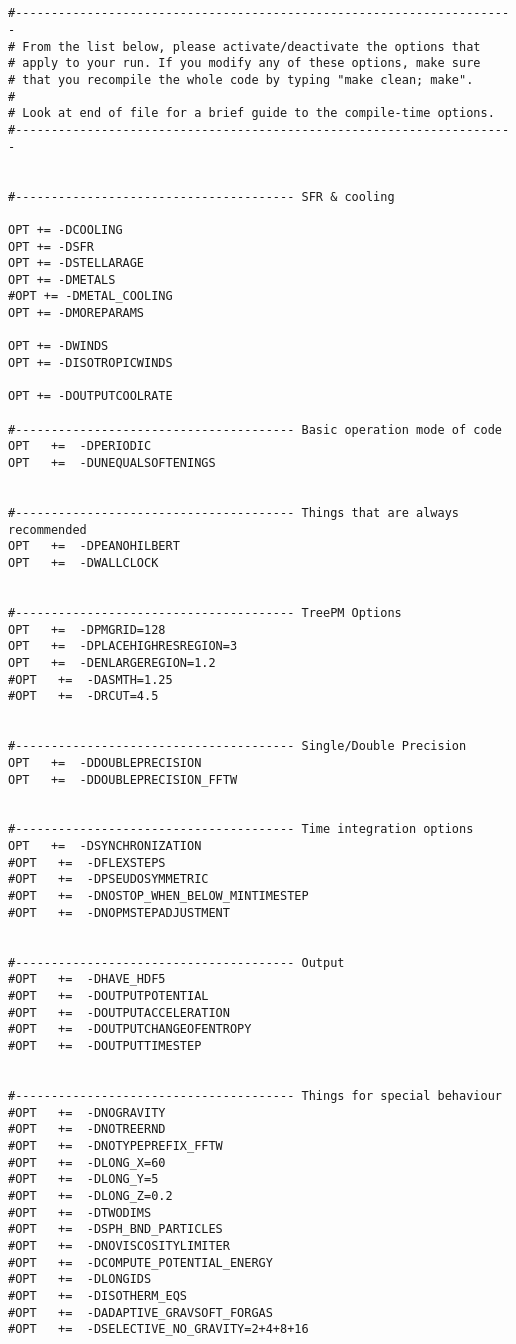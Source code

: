 \documentclass[a4paper,english,10.5pt]{scrartcl}
\begin{document}
\begin{verbatim}
 

#----------------------------------------------------------------------
# From the list below, please activate/deactivate the options that     
# apply to your run. If you modify any of these options, make sure     
# that you recompile the whole code by typing "make clean; make".      
#                                                                      
# Look at end of file for a brief guide to the compile-time options.   
#----------------------------------------------------------------------


#--------------------------------------- SFR & cooling

OPT += -DCOOLING
OPT += -DSFR
OPT += -DSTELLARAGE
OPT += -DMETALS
#OPT += -DMETAL_COOLING
OPT += -DMOREPARAMS

OPT += -DWINDS
OPT += -DISOTROPICWINDS

OPT += -DOUTPUTCOOLRATE

#--------------------------------------- Basic operation mode of code
OPT   +=  -DPERIODIC 
OPT   +=  -DUNEQUALSOFTENINGS


#--------------------------------------- Things that are always recommended
OPT   +=  -DPEANOHILBERT
OPT   +=  -DWALLCLOCK   


#--------------------------------------- TreePM Options
OPT   +=  -DPMGRID=128
OPT   +=  -DPLACEHIGHRESREGION=3
OPT   +=  -DENLARGEREGION=1.2
#OPT   +=  -DASMTH=1.25
#OPT   +=  -DRCUT=4.5


#--------------------------------------- Single/Double Precision
OPT   +=  -DDOUBLEPRECISION      
OPT   +=  -DDOUBLEPRECISION_FFTW      


#--------------------------------------- Time integration options
OPT   +=  -DSYNCHRONIZATION
#OPT   +=  -DFLEXSTEPS
#OPT   +=  -DPSEUDOSYMMETRIC
#OPT   +=  -DNOSTOP_WHEN_BELOW_MINTIMESTEP
#OPT   +=  -DNOPMSTEPADJUSTMENT


#--------------------------------------- Output 
#OPT   +=  -DHAVE_HDF5  
#OPT   +=  -DOUTPUTPOTENTIAL
#OPT   +=  -DOUTPUTACCELERATION
#OPT   +=  -DOUTPUTCHANGEOFENTROPY
#OPT   +=  -DOUTPUTTIMESTEP


#--------------------------------------- Things for special behaviour
#OPT   +=  -DNOGRAVITY     
#OPT   +=  -DNOTREERND 
#OPT   +=  -DNOTYPEPREFIX_FFTW        
#OPT   +=  -DLONG_X=60
#OPT   +=  -DLONG_Y=5
#OPT   +=  -DLONG_Z=0.2
#OPT   +=  -DTWODIMS
#OPT   +=  -DSPH_BND_PARTICLES
#OPT   +=  -DNOVISCOSITYLIMITER
#OPT   +=  -DCOMPUTE_POTENTIAL_ENERGY
#OPT   +=  -DLONGIDS
#OPT   +=  -DISOTHERM_EQS
#OPT   +=  -DADAPTIVE_GRAVSOFT_FORGAS
#OPT   +=  -DSELECTIVE_NO_GRAVITY=2+4+8+16


\end{verbatim}
\end{document}
